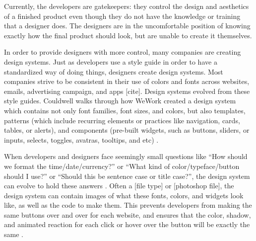 \documentclass{sigchi}
\begin{document}
Currently, the developers are gatekeepers: they control the design and aesthetics of a finished product even though they do not have the knowledge or training that a designer does. The designers are in the uncomfortable position of knowing exactly how the final product should look, but are unable to create it themselves. 

In order to provide designers with more control, many companies are creating design systems. Just as developers use a style guide in order to have a standardized way of doing things, designers create design systems. 
Most companies strive to be consistent in their use of colors and fonts across websites, emails, advertising campaign, and apps [cite]. Design systems evolved from these style guides. Couldwell walks through how WeWork created a design system which contains not only font families, font sizes, and colors, but also templates, patterns (which include recurring elements or practices like navigation, cards, tables, or alerts), and components (pre-built widgets, such as buttons, sliders, or inputs, selects, toggles, avatras, tooltips, and etc) \cite{design_system_at_plasma_couldwell_medium_2017}. 



When developers and designers face seemingly small questions like ``How should we format the time/date/currency?'' or ``What kind of color/typeface/button should I use?'' or ``Should this be sentence case or title case?'', the design system can evolve to hold these answers \cite{what_is_design_system_couldwell_medium_2017}. Often a [file type] or [photoshop file], the design system can contain images of what these fonts, colors, and widgets look like, as well as the code to make them. This prevents developers from making the same buttons over and over for each website, and ensures that the color, shadow, and animated reaction for each click or hover over the button will be exactly the same \cite{what_is_design_system_couldwell_medium_2017}. 
\end{document}
